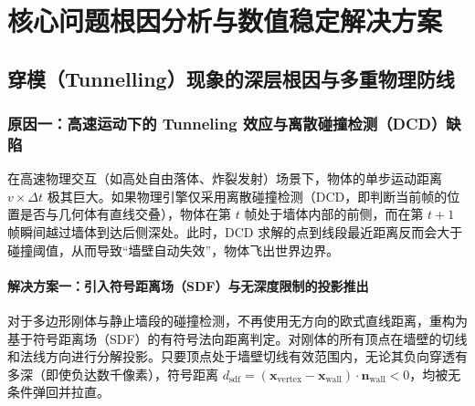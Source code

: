 \documentclass[11pt,a4paper]{article}
\begin{document}
\section{核心问题根因分析与数值稳定解决方案}

\subsection{穿模（Tunnelling）现象的深层根因与多重物理防线}

\subsubsection{原因一：高速运动下的 Tunneling 效应与离散碰撞检测（DCD）缺陷}
在高速物理交互（如高处自由落体、炸裂发射）场景下，物体的单步运动距离 $v \times \Delta t$ 极其巨大。如果物理引擎仅采用离散碰撞检测（DCD，即判断当前帧的位置是否与几何体有直线交叠），物体在第 $t$ 帧处于墙体内部的前侧，而在第 $t+1$ 帧瞬间越过墙体到达后侧深处。此时，DCD 求解的点到线段最近距离反而会大于碰撞阈值，从而导致“墙壁自动失效”，物体飞出世界边界。

\paragraph{解决方案一：引入符号距离场（SDF）与无深度限制的投影推出}
对于多边形刚体与静止墙段的碰撞检测，不再使用无方向的欧式直线距离，重构为基于符号距离场（SDF）的有符号法向距离判定。对刚体的所有顶点在墙壁的切线和法线方向进行分解投影。只要顶点处于墙壁切线有效范围内，无论其负向穿透有多深（即使负达数千像素），符号距离 $d_{\text{sdf}} = (\mathbf{x}_{\text{vertex}} - \mathbf{x}_{\text{wall}}) \cdot \mathbf{n}_{\text{wall}} < 0$，均被无条件弹回并拉直。
\end{document}
